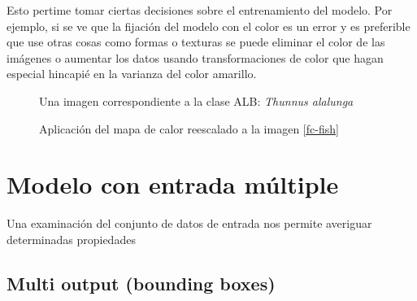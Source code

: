 Esto pertime tomar ciertas decisiones sobre el entrenamiento del modelo. Por ejemplo, si se ve que la fijación del modelo con el color es un error y es preferible que use otras cosas como formas o texturas se puede eliminar el color de las imágenes o aumentar los datos usando transformaciones de color que hagan especial hincapié en la varianza del color amarillo.

\begin{figure}
    \caption{Una imagen correspondiente a la clase ALB: \textit{Thunnus alalunga}}
\label{yft}
\end{figure}

\begin{figure}
    \caption{Aplicación del mapa de calor reescalado a la imagen \ref{fc-fish}}
\label{yft-heatmap}
\end{figure}

\section{Modelo con entrada múltiple}

Una examinación del conjunto de datos de entrada nos permite averiguar determinadas propiedades
\subsection{Multi output (bounding boxes)}

